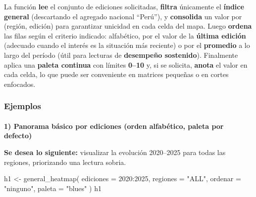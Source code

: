 \documentclass[
  11pt,
  letterpaper,
  DIV=11,
  numbers=noendperiod]{scrartcl}
\makeatletter
\let\oldparagraph\paragraph
\renewcommand{\paragraph}{
    \@ifstar
      \xxxParagraphStar
      \xxxParagraphNoStar
  }
\newcommand{\xxxParagraphStar}[1]{\oldparagraph*{#1}\mbox{}}
\newcommand{\xxxParagraphNoStar}[1]{\oldparagraph{#1}\mbox{}}
\newenvironment{Shaded}{\begin{snugshade}}{\end{snugshade}}
\newcommand{\AttributeTok}[1]{\textcolor[rgb]{0.40,0.45,0.13}{#1}}
\newcommand{\DecValTok}[1]{\textcolor[rgb]{0.68,0.00,0.00}{#1}}
\newcommand{\FunctionTok}[1]{\textcolor[rgb]{0.28,0.35,0.67}{#1}}
\newcommand{\NormalTok}[1]{\textcolor[rgb]{0.00,0.23,0.31}{#1}}
\newcommand{\OtherTok}[1]{\textcolor[rgb]{0.00,0.23,0.31}{#1}}
\newcommand{\SpecialCharTok}[1]{\textcolor[rgb]{0.37,0.37,0.37}{#1}}
\newcommand{\StringTok}[1]{\textcolor[rgb]{0.13,0.47,0.30}{#1}}
\makeatother
\begin{document}
La función \textbf{lee} el conjunto de ediciones solicitadas,
\textbf{filtra} únicamente el \textbf{índice general} (descartando el
agregado nacional ``Perú''), y \textbf{consolida} un valor por (región,
edición) para garantizar unicidad en cada celda del mapa. Luego
\textbf{ordena} las filas según el criterio indicado: alfabético, por el
valor de la \textbf{última edición} (adecuado cuando el interés es la
situación más reciente) o por el \textbf{promedio} a lo largo del
período (útil para lecturas de \textbf{desempeño sostenido}). Finalmente
aplica una \textbf{paleta continua} con límites \textbf{0--10} y, si se
solicita, \textbf{anota} el valor en cada celda, lo que puede ser
conveniente en matrices pequeñas o en cortes enfocados.

\subsubsection{\texorpdfstring{\textbf{Ejemplos}}{Ejemplos}}\label{ejemplos-4}

\paragraph{\texorpdfstring{\textbf{1) Panorama básico por ediciones
(orden alfabético, paleta por
defecto)}}{1) Panorama básico por ediciones (orden alfabético, paleta por defecto)}}\label{panorama-buxe1sico-por-ediciones-orden-alfabuxe9tico-paleta-por-defecto}

\textbf{Se desea lo siguiente:} visualizar la evolución 2020--2025 para
todas las regiones, priorizando una lectura sobria.

\begin{Shaded}
\begin{Highlighting}[]
\NormalTok{h1 }\OtherTok{\textless{}{-}} \FunctionTok{general\_heatmap}\NormalTok{(}
  \AttributeTok{ediciones =} \DecValTok{2020}\SpecialCharTok{:}\DecValTok{2025}\NormalTok{,}
  \AttributeTok{regiones  =} \StringTok{"ALL"}\NormalTok{,}
  \AttributeTok{ordenar   =} \StringTok{"ninguno"}\NormalTok{,}
  \AttributeTok{paleta    =} \StringTok{"blues"}
\NormalTok{)}
\NormalTok{h1}
\end{Highlighting}
\end{Shaded}
\end{document}
